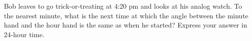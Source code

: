 Bob leaves to go trick-or-treating at 4:20 pm and looks at his analog watch. To the nearest minute, what is the next time at which the angle between the minute hand and the hour hand is the same as when he started? Express your answer in 24-hour time.
